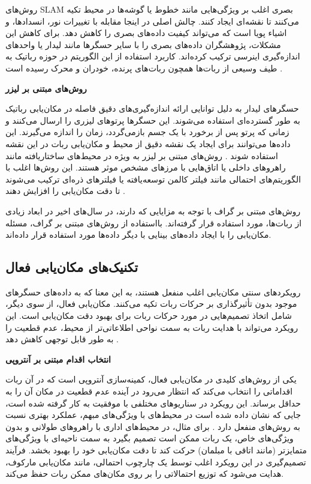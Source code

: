 روش‌های SLAM بصری اغلب بر ویژگی‌هایی مانند خطوط یا گوشه‌ها در محیط تکیه می‌کنند تا نقشه‌ای ایجاد کنند. چالش اصلی در اینجا مقابله با تغییرات نور، انسدادها، و اشیاء پویا است که می‌تواند کیفیت داده‌های بصری را کاهش دهد. برای کاهش این مشکلات، پژوهشگران داده‌های بصری را با سایر حسگرها مانند لیدار یا واحدهای اندازه‌گیری اینرسی ترکیب کرده‌اند. کاربرد استفاده از این الگوریتم در حوزه رباتیک به طیف وسیعی از ربات‌ها همچون ربات‌های پرنده، خودران و محرک رسیده است
\cite{guan2021robot, khairuddin2015review, choset2001topological}.

\textbf{روش‌های مبتنی بر لیزر}

حسگرهای لیدار به دلیل توانایی ارائه اندازه‌گیری‌های دقیق فاصله در مکان‌یابی رباتیک به طور گسترده‌ای استفاده می‌شوند. این حسگرها پرتوهای لیزری را ارسال می‌کنند و زمانی که پرتو پس از برخورد با یک جسم بازمی‌گردد، زمان را اندازه می‌گیرند. این داده‌ها می‌توانند برای ایجاد یک نقشه دقیق از محیط و مکان‌یابی ربات در این نقشه استفاده شوند
 \cite{xu2019indoor}. 
روش‌های مبتنی بر لیزر به ویژه در محیط‌های ساختاریافته مانند راهروهای داخلی یا اتاق‌هایی با مرزهای مشخص موثر هستند. این روش‌ها اغلب با الگوریتم‌های احتمالی مانند فیلتر کالمن توسعه‌یافته یا فیلترهای ذره‌ای ترکیب می‌شوند تا دقت مکان‌یابی را افزایش دهند
 \cite{liu2022improved, blok2019robot}.
 
 روش‌های مبتنی بر گراف با توجه به مزایایی که دارند، در سال‌های اخیر در ابعاد زیادی از ربات‌ها، مورد استفاده قرار گرفته‌اند. 
 \cite{yang2022indoor, song2021tightly, li2015gaussian, dai2022uav} بااستفاده از روش‌های مبتنی بر گراف، مسئله مکان‌یابی را با ایجاد داده‌های بینایی با دیگر داده‌ها مورد استفاده قرار داده‌اند.

\subsection{تکنیک‌های مکان‌یابی فعال}

رویکردهای سنتی مکان‌یابی اغلب منفعل هستند، به این معنا که به داده‌های حسگرهای موجود بدون تأثیرگذاری بر حرکات ربات تکیه می‌کنند. مکان‌یابی فعال، از سوی دیگر، شامل اتخاذ تصمیم‌هایی در مورد حرکات ربات برای بهبود دقت مکان‌یابی است. این رویکرد می‌تواند با هدایت ربات به سمت نواحی اطلاعاتی‌تر از محیط، عدم قطعیت را به طور قابل توجهی کاهش دهد
\cite{burgard1997active}.

\textbf{انتخاب اقدام مبتنی بر آنتروپی}

یکی از روش‌های کلیدی در مکان‌یابی فعال، کمینه‌سازی آنتروپی است که در آن ربات اقداماتی را انتخاب می‌کند که انتظار می‌رود در آینده عدم قطعیت در مکان آن را به حداقل برساند. این رویکرد در سناریوهای مختلفی با موفقیت به کار گرفته شده است، جایی که نشان داده شده است در محیط‌های با ویژگی‌های مبهم، عملکرد بهتری نسبت به روش‌های منفعل دارد
\cite{burgard1997active2}.
برای مثال، در محیط‌های اداری با راهروهای طولانی و بدون ویژگی‌های خاص، یک ربات ممکن است تصمیم بگیرد به سمت ناحیه‌ای با ویژگی‌های متمایزتر (مانند اتاقی با مبلمان) حرکت کند تا دقت مکان‌یابی خود را بهبود بخشد. فرآیند تصمیم‌گیری در این رویکرد اغلب توسط یک چارچوب احتمالی، مانند مکان‌یابی مارکوف، هدایت می‌شود که توزیع احتمالاتی را بر روی مکان‌های ممکن ربات حفظ می‌کند.

